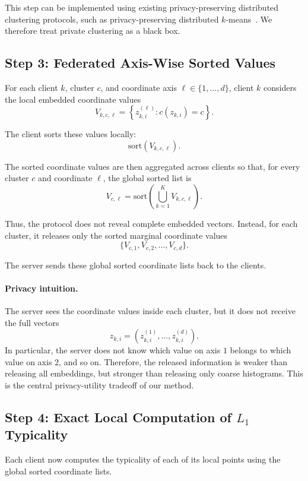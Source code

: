 \documentclass{article}
\begin{document}
This step can be implemented using existing privacy-preserving distributed clustering protocols, such as privacy-preserving distributed $k$-means~\cite{vaidya2003privacy,jagannathan2005privacy}. We therefore treat private clustering as a black box.

\subsection{Step 3: Federated Axis-Wise Sorted Values}

For each client $k$, cluster $c$, and coordinate axis $\ell \in \{1,\dots,d\}$, client $k$ considers the local embedded coordinate values
\[
    V_{k,c,\ell}
    =
    \left\{
    z_{k,i}^{(\ell)}
    :
    c(z_{k,i}) = c
    \right\}.
\]

The client sorts these values locally:
\[
    \mathrm{sort}(V_{k,c,\ell}).
\]

The sorted coordinate values are then aggregated across clients so that, for every cluster $c$ and coordinate $\ell$, the global sorted list is
\[
    V_{c,\ell}
    =
    \mathrm{sort}
    \left(
    \bigcup_{k=1}^K V_{k,c,\ell}
    \right).
\]

Thus, the protocol does not reveal complete embedded vectors. Instead, for each cluster, it releases only the sorted marginal coordinate values
\[
    \{V_{c,1},V_{c,2},\dots,V_{c,d}\}.
\]

The server sends these global sorted coordinate lists back to the clients.

\paragraph{Privacy intuition.}
The server sees the coordinate values inside each cluster, but it does not receive the full vectors
\[
    z_{k,i} = (z_{k,i}^{(1)},\dots,z_{k,i}^{(d)}).
\]
In particular, the server does not know which value on axis $1$ belongs to which value on axis $2$, and so on. Therefore, the released information is weaker than releasing all embeddings, but stronger than releasing only coarse histograms. This is the central privacy-utility tradeoff of our method.

\subsection{Step 4: Exact Local Computation of $L_1$ Typicality}

Each client now computes the typicality of each of its local points using the global sorted coordinate lists.
\end{document}
